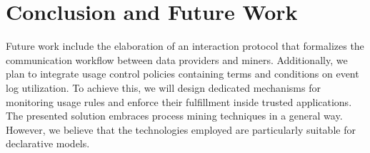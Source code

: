 \section{Conclusion and Future Work}
\label{sec:conclusion}

Future work include the elaboration of an interaction protocol that formalizes the communication workflow between data providers and miners. Additionally, we plan to integrate usage control policies containing terms and conditions on event log utilization. To achieve this, we will design dedicated mechanisms for monitoring usage rules and enforce their fulfillment inside trusted applications. The presented solution embraces process mining techniques in a general way. However, we believe that the technologies employed are particularly suitable for declarative models.

\begin{comment}
Limitations:
\begin{itemize}
    \item Both producer and consumer act fairly (so we do not expect to have injected data)
    \item We do not manage TEE crashes
    \item We assume a perfect communication channel (no loss, no snap, no corrupted bits)
    \item Universal clock for event timestamps (cite Event log cleaning for business process analytics by Andreas Solti)
\end{itemize} 
Future Work:
\begin{itemize}
    \item Declarative models adaptation
    \item Output inside the TEE, interactions through trusted applications
    \item Real-world event log data
    \item Usage policies integration ok
    \item Formal interaction protocol ok
    \item Threat model
    \item Security evaluation
\end{itemize}


\end{comment}